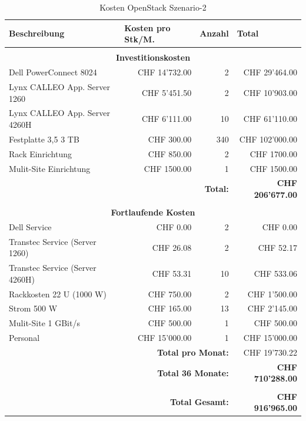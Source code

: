 \begin{table}[htbp]
\caption{Kosten OpenStack Szenario-2}
\begin{small}
\begin{tabular}{|l|r|r|r|}
\hline
\textbf{Beschreibung} & \multicolumn{1}{l|}{\textbf{Kosten pro Stk/M.}} & \multicolumn{1}{l|}{\textbf{Anzahl}} & \multicolumn{1}{l|}{\textbf{Total}} \\ \hline
 \multicolumn{ 4}{c}{} \\ \hline
\multicolumn{ 4}{|c|}{\textbf{Investitionskosten}} \\ \hline
Dell PowerConnect 8024 & CHF 14'732.00 & 2 & CHF 29'464.00 \\ \hline
Lynx CALLEO App. Server 1260 & CHF 5'451.50 & 2 & CHF 10'903.00 \\ \hline
Lynx CALLEO App. Server 4260H & CHF 6'111.00 & 10 & CHF 61'110.00 \\ \hline
Festplatte 3,5 3 TB & CHF 300.00 & 340 & CHF 102'000.00 \\ \hline
Rack Einrichtung & CHF 850.00 & 2 & CHF 1700.00 \\ \hline \hline
Mulit-Site Einrichtung & CHF 1500.00 & 1 & CHF 1500.00 \\ \hline \hline
 \multicolumn{ 3}{r|}{\textbf{Total:}} & \textbf{CHF 206'677.00} \\ \cline{4-4}
\multicolumn{ 4}{c}{} \\ \hline
\multicolumn{ 4}{|c|}{\textbf{Fortlaufende Kosten}} \\ \hline
Dell Service & CHF 0.00 & 2 & CHF 0.00 \\ \hline
Transtec Service (Server 1260) & CHF 26.08 & 2 & CHF 52.17 \\ \hline
Transtec Service (Server 4260H) & CHF 53.31 & 10 & CHF 533.06 \\ \hline
Rackkosten 22 U (1000 W) & CHF 750.00 & 2 & CHF 1'500.00 \\ \hline
Strom 500 W & CHF 165.00 & 13 & CHF 2'145.00 \\ \hline
Mulit-Site 1 GBit/s & CHF 500.00 & 1 & CHF 500.00 \\ \hline
Personal & CHF 15'000.00 & 1 & CHF 15'000.00 \\ \hline \hline
 \multicolumn{ 3}{r|}{\textbf{Total pro Monat:}} & CHF 19'730.22 \\ \cline{4-4}
 \multicolumn{ 3}{r|}{\textbf{Total 36 Monate:}} & \textbf{CHF 710'288.00} \\ \cline{4-4}
 \multicolumn{ 4}{c}{} \\ \cline{4-4}
 \multicolumn{ 3}{r|}{\textbf{Total Gesamt:}} & \textbf{CHF 916'965.00} \\ \cline{4-4}
\end{tabular}
\end{small}
\label{tab:KostenOpenStackS2}
\end{table}


